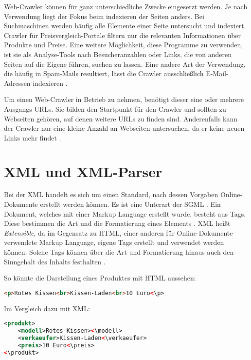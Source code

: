 Web-Crawler können für ganz unterschiedliche Zwecke eingesetzt werden. Je nach Verwendung liegt der Fokus beim indexieren der Seiten anders. Bei Suchmaschinen werden häufig alle Elemente einer Seite untersucht und indexiert. Crawler für Preisvergleich-Portale filtern nur die relevanten Informationen über Produkte und Preise. Eine weitere Möglichkeit, diese Programme zu verwenden, ist sie als Analyse-Tools nach Besucheranzahlen oder Links, die von anderen Seiten auf die Eigene führen, suchen zu lassen. Eine andere Art der Verwendung, die häufig in Spam-Mails resultiert, lässt die Crawler ausschließlich E-Mail-Adressen indexieren \cite{ryte}.

Um einen Web-Crawler in Betrieb zu nehmen, benötigt dieser eine oder mehrere Ausgangs-URLs. Sie bilden den Startpunkt für den Crawler und sollten zu Webseiten gehören, auf denen weitere URLs zu finden sind. Anderenfalls kann der Crawler nur eine kleine Anzahl an Webseiten untersuchen, da er keine neuen Links mehr findet \cite{how}. 


\newpage

\section{XML und XML-Parser}
\large
Bei der \ac{XML} handelt es sich um einen Standard, nach dessen Vorgaben Online-Dokumente erstellt werden können. Es ist eine Unterart der \ac{SGML} \cite{xmldef}. Ein Dokument, welches mit einer Markup Language erstellt wurde, besteht aus Tags. Diese bestimmen die Art und die Formatierung eines Elements \cite{markup}. \ac{XML} heißt \textit{Extensible}, da im Gegensatz zu \ac{HTML}, einer anderen für Online-Dokumente verwendete Markup Language, eigene Tags erstellt und verwendet werden können. Solche Tags können über die Art und Formatierung hinaus auch den Sinngehalt des Inhalts festhalten \cite{xmldef}.

So könnte die Darstellung eines Produktes mit \acs{HTML} aussehen: \\
\begin{lstlisting}[title=Beispiel-Code HTML, language=HTML]
<p>Rotes Kissen<br>Kissen-Laden<br>10 Euro<\p>
\end{lstlisting}

Im Vergleich dazu mit \ac{XML}: \\

\begin{lstlisting}[title=Beispiel-Code XML, language=XML, morekeywords={produkt, modell, verkaeufer, preis}]
<produkt>
	<modell>Rotes Kissen><\modell>
	<verkaeufer>Kissen-Laden<\verkaeufer>
	<preis>10 Euro<\preis>
<\produkt>
\end{lstlisting}


